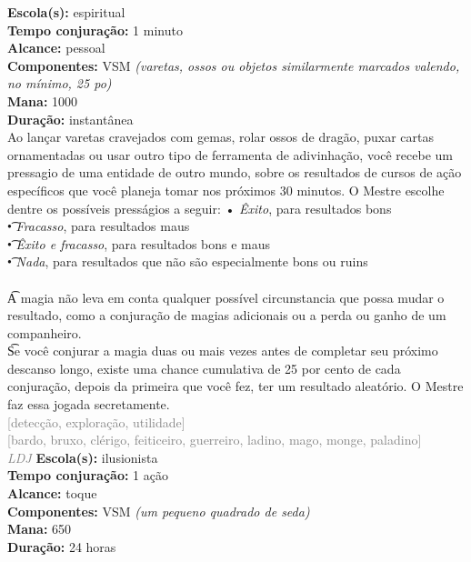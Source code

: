 \documentclass{RPG_Adventure}[2021/10/20]
\begin{document}
{\small \t \textbf{Escola(s):} espiritual\\\t \textbf{Tempo conjuração:} 1 minuto\\\t \textbf{Alcance:} pessoal\\\t \textbf{Componentes:} VSM \textit{(varetas, ossos ou objetos similarmente marcados valendo, no mínimo, 25 po)}\\\t \textbf{Mana:} 1000\\\t \textbf{Duração:} instantânea\\}
{\normalsize Ao lançar varetas cravejados com gemas, rolar ossos de dragão, puxar cartas ornamentadas ou usar outro tipo de ferramenta de adivinhação, você recebe um pressagio de uma entidade de outro mundo, sobre os resultados de cursos de ação específicos que você planeja tomar nos próximos 30 minutos. O Mestre escolhe dentre os possíveis presságios a seguir: • \textit{Êxito}, para resultados bons\\\t • \textit{Fracasso}, para resultados maus\\\t • \textit{Êxito e fracasso}, para resultados bons e maus\\\t • \textit{Nada}, para resultados que não são especialmente bons ou ruins\\\\\t A magia não leva em conta qualquer possível circunstancia que possa mudar o resultado, como a conjuração de magias adicionais ou a perda ou ganho de um companheiro.\\\t Se você conjurar a magia duas ou mais vezes antes de completar seu próximo descanso longo, existe uma chance cumulativa de 25 por cento de cada conjuração, depois da primeira que você fez, ter um resultado aleatório. O Mestre faz essa jogada secretamente.\\}
{\scriptsize \textcolor{gray}{[detecção, exploração, utilidade]\\}}
{\scriptsize \textcolor{gray}{[bardo, bruxo, clérigo, feiticeiro, guerreiro, ladino, mago, monge, paladino]\\}}
{\tiny \textcolor{gray}{\textit{LDJ}}}
{\small \t \textbf{Escola(s):} ilusionista\\\t \textbf{Tempo conjuração:} 1 ação\\\t \textbf{Alcance:} toque\\\t \textbf{Componentes:} VSM \textit{(um pequeno quadrado de seda)}\\\t \textbf{Mana:} 650\\\t \textbf{Duração:} 24 horas\\}
\end{document}
